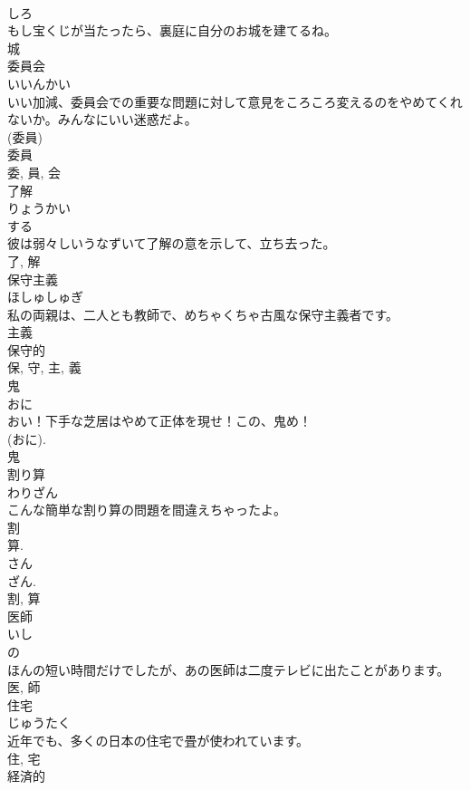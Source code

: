 \documentclass[8pt]{extreport}
\begin{document}
\begin{CJK}{UTF8}{min}
\\	しろ	
\\	もし宝くじが当たったら、裏庭に自分のお城を建てるね。	
\\	城	
\\	委員会	
\\	いいんかい	
\\	いい加減、委員会での重要な問題に対して意見をころころ変えるのをやめてくれないか。みんなにいい迷惑だよ。	
\\	(委員) 
\\	委員 
\\	委, 員, 会	
\\	了解	
\\	りょうかい	
\\	する 
\\	彼は弱々しいうなずいて了解の意を示して、立ち去った。	
\\	了, 解	
\\	保守主義	
\\	ほしゅしゅぎ	
\\	私の両親は、二人とも教師で、めちゃくちゃ古風な保守主義者です。	
\\	主義 
\\	保守的 
\\	保, 守, 主, 義	
\\	鬼	
\\	おに	
\\	おい！下手な芝居はやめて正体を現せ！この、鬼め！	
\\	(おに).
\\	鬼	
\\	割り算	
\\	わりざん	
\\	こんな簡単な割り算の問題を間違えちゃったよ。	
\\	割 
\\	算. 
\\	さん 
\\	ざん. 
\\	割, 算	
\\	医師	
\\	いし	
\\	の 
\\	ほんの短い時間だけでしたが、あの医師は二度テレビに出たことがあります。	
\\	医, 師	
\\	住宅	
\\	じゅうたく	
\\	近年でも、多くの日本の住宅で畳が使われています。	
\\	住, 宅	
\\	経済的	

\end{CJK}
\end{document}
